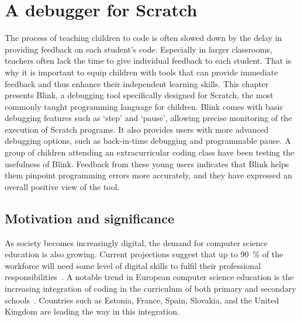 \documentclass[../main]{subfiles}
\begin{document}
\chapter{A debugger for Scratch}\label{ch:blink}


The process of teaching children to code is often slowed down by the delay in providing feedback on each student's code.
Especially in larger classrooms, teachers often lack the time to give individual feedback to each student.
That is why it is important to equip children with tools that can provide immediate feedback and thus enhance their independent learning skills.
This chapter presents Blink, a debugging tool specifically designed for Scratch, the most commonly taught programming language for children.
Blink comes with basic debugging features such as `step' and `pause', allowing precise monitoring of the execution of Scratch programs.
It also provides users with more advanced debugging options, such as back-in-time debugging and programmable pause.
A group of children attending an extracurricular coding class have been testing the usefulness of Blink.
Feedback from these young users indicates that Blink helps them pinpoint programming errors more accurately, and they have expressed an overall positive view of the tool.

\section{Motivation and significance}\label{sec:blink-motivation}

As society becomes increasingly digital, the demand for computer science education is also growing.
Current projections suggest that up to \qty{90}{\percent} of the workforce will need some level of digital skills to fulfil their professional responsibilities~\autocite{bejakovicImportanceDigitalLiteracy2020}.
A notable trend in European computer science education is the increasing integration of coding in the curriculum of both primary and secondary schools~\autocite{balanskatComputingOurFuture2015}.
Countries such as Estonia, France, Spain, Slovakia, and the United Kingdom are leading the way in this integration.
\end{document}

